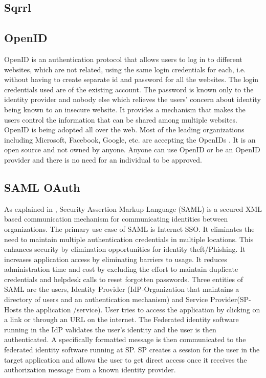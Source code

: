 \subsection{ Sqrrl}
\subsection{ OpenID }

     OpenID is an authentication protocol that allows users to log in
     to different websites, which are not related, using the same
     login credentials for each, i.e. without having to create
     separate id and password for all the websites. The login
     credentials used are of the existing account. The password is
     known only to the identity provider and nobody else which
     relieves the users’ concern about identity being known to an
     insecure website. \cite{ope1} It provides a mechanism that makes
     the users control the information that can be shared among
     multiple websites. OpenID is being adopted all over the web. Most
     of the leading organizations including Microsoft, Facebook,
     Google, etc. are accepting the OpenIDs \cite{ope2}. It is an
     open source and not owned by anyone. Anyone can use OpenID or be
     an OpenID provider and there is no need for an individual to be
     approved.

\subsection{ SAML OAuth}

     As explained in \cite{www-SAML}, Security Assertion Markup
     Language (SAML) is a secured XML based communication mechanism
     for communicating identities between organizations. The primary
     use case of SAML is Internet SSO. It eliminates the need to
     maintain multiple authentication credentials in multiple
     locations. This enhances security by elimination opportunities
     for identity theft/Phishing. It increases application access by
     eliminating barriers to usage. It reduces administration time and
     cost by excluding the effort to maintain duplicate credentials
     and helpdesk calls to reset forgotten passwords. Three entities
     of SAML are the users, Identity Provider (IdP-Organization that
     maintains a directory of users and an authentication mechanism)
     and Service Provider(SP-Hosts the application /service). User
     tries to access the application by clicking on a link or through
     an URL on the internet. The Federated identity software running
     in the IdP validates the user's identity and the user is then
     authenticated. A specifically formatted message is then
     communicated to the federated identity software running at SP. SP
     creates a session for the user in the target application and
     allows the user to get direct access once it receives the
     authorization message from a known identity provider.

